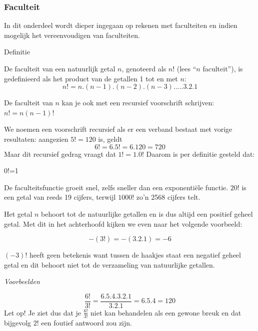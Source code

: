 \subsubsection{Faculteit}
In dit onderdeel wordt dieper ingegaan op rekenen met faculteiten en indien mogelijk het vereenvoudigen van faculteiten.

Definitie

\begin{definitie}
	De faculteit van een natuurlijk getal $n$, genoteerd als $n!$ (lees “$n$ faculteit”), is gedefinieerd als het product van de getallen 1 tot en met $n$:
	\begin{equation*}
	n!=n.(n-1).(n-2).(n-3).\ldots.3.2.1
	\end{equation*}
\end{definitie}

De faculteit van $n$ kan je ook met een recursief voorschrift schrijven: $n!=n(n-1)!$

We noemen een voorschrift recursief als er een verband bestaat met vorige resultaten: aangezien $5!=120$ is, geldt
\begin{equation*}
6!=6.5!=6.120=720
\end{equation*}
Maar dit recursief gedrag vraagt dat $1!=1.0!$ Daarom is per definitie gesteld dat:

\begin{definitie}
	0!=1
\end{definitie}

De faculteitsfunctie groeit snel, zelfs sneller dan een exponenti\"ele functie.  $20!$ is een getal van reeds 19 cijfers, terwijl $1000!$ zo'n 2568 cijfers telt.

Het getal $n$ behoort tot de natuurlijke getallen en is dus altijd een positief geheel getal.
Met dit in het achterhoofd kijken we even naar het volgende voorbeeld:

\begin{equation*}
-(3!)=-(3.2.1)=-6
\end{equation*}

$(-3)!$ heeft geen betekenis want tussen de haakjes staat een negatief geheel getal en dit behoort niet tot de verzameling van natuurlijke getallen.

\emph{Voorbeelden}
\begin{voorbeeld}
	\begin{equation*}
	\frac{6!}{3!}=\frac{6.5.4.3.2.1}{3.2.1} = 6.5.4 = 120
	\end{equation*}
	Let op! Je ziet dus dat je $\frac{6!}{3!}$ niet kan behandelen als een gewone breuk en dat bijgevolg $2!$ een foutief antwoord zou zijn.
\end{voorbeeld}

